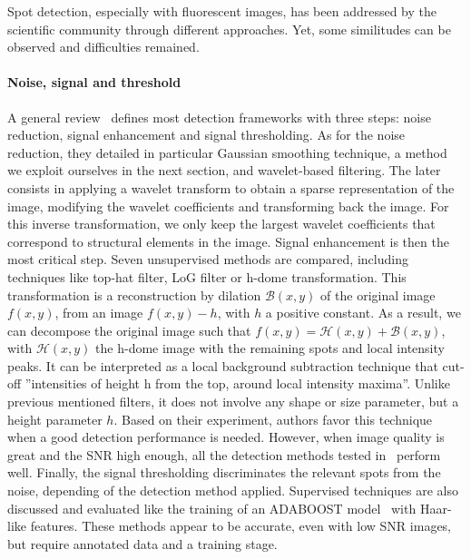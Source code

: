 Spot detection, especially with fluorescent images, has been addressed by the scientific community through different approaches.  Yet, some similitudes can be observed and difficulties remained.

\paragraph{Noise, signal and threshold}

A general review~\cite{smal_quantitative_2010} defines most detection frameworks with three steps: noise reduction, signal enhancement and signal thresholding.
As for the noise reduction, they detailed in particular Gaussian smoothing technique, a method we exploit ourselves in the next section, and wavelet-based filtering.
The later consists in applying a wavelet transform to obtain a sparse representation of the image, modifying the wavelet coefficients and transforming back the image.
For this inverse transformation, we only keep the largest wavelet coefficients that correspond to structural elements in the image.
Signal enhancement is then the most critical step.
Seven unsupervised methods are compared, including techniques like top-hat filter, \ac{LoG} filter or h-dome transformation.
This transformation is a reconstruction by dilation $\mathcal{B}(x, y)$ of the original image $f(x, y)$, from an image $f(x, y) - h$, with $h$ a positive constant.
As a result, we can decompose the original image such that $f(x, y) = \mathcal{H}(x, y) + \mathcal{B}(x, y)$, with $\mathcal{H}(x, y)$ the h-dome image with the remaining spots and local intensity peaks.
It can be interpreted as a local background subtraction technique that cut-off ''intensities of height h from the top, around local intensity maxima''.
Unlike previous mentioned filters, it does not involve any shape or size parameter, but a height parameter $h$.
Based on their experiment, authors favor this technique when a good detection performance is needed.
However, when image quality is great and the \ac{SNR} high enough, all the detection methods tested in~\cite{smal_quantitative_2010} perform well.
Finally, the signal thresholding discriminates the relevant spots from the noise, depending of the detection method applied.
Supervised techniques are also discussed and evaluated like the training of an ADABOOST model~\cite{FREUND1997119} with Haar-like features.
These methods appear to be accurate, even with low \ac{SNR} images, but require annotated data and a training stage.


